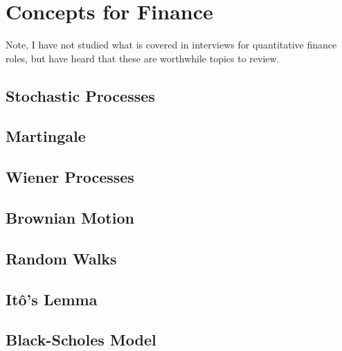 \chapter{Concepts for Finance}
\label{finance}

Note, I have not studied what is covered in interviews for quantitative finance roles,
but have heard that these are worthwhile topics to review.

\section{Stochastic Processes}
\label{finance:sp}

\section{Martingale}
\label{finance:martingale}

\section{Wiener Processes}
\label{finance:wiener}

\section{Brownian Motion}
\label{finance:brownian}

\section{Random Walks}
\label{finance:rand_walk}

\section{It\^o's Lemma}
\label{finance:ito_lemma}

\section{Black-Scholes Model}
\label{finance:black_scholes}

